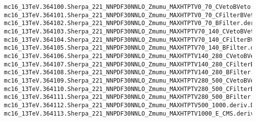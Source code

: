 \begin{tiny}
\begin{verbatim}
mc16_13TeV.364100.Sherpa_221_NNPDF30NNLO_Zmumu_MAXHTPTV0_70_CVetoBVeto.deriv.DAOD_STDM7.e5271_s3126_r10724_p3712
mc16_13TeV.364101.Sherpa_221_NNPDF30NNLO_Zmumu_MAXHTPTV0_70_CFilterBVeto.deriv.DAOD_STDM7.e5271_s3126_r10724_p3712
mc16_13TeV.364102.Sherpa_221_NNPDF30NNLO_Zmumu_MAXHTPTV0_70_BFilter.deriv.DAOD_STDM7.e5271_s3126_r10724_p3712
mc16_13TeV.364103.Sherpa_221_NNPDF30NNLO_Zmumu_MAXHTPTV70_140_CVetoBVeto.deriv.DAOD_STDM7.e5271_s3126_r10724_p3712
mc16_13TeV.364104.Sherpa_221_NNPDF30NNLO_Zmumu_MAXHTPTV70_140_CFilterBVeto.deriv.DAOD_STDM7.e5271_s3126_r10724_p3712
mc16_13TeV.364105.Sherpa_221_NNPDF30NNLO_Zmumu_MAXHTPTV70_140_BFilter.deriv.DAOD_STDM7.e5271_s3126_r10724_p3712
mc16_13TeV.364106.Sherpa_221_NNPDF30NNLO_Zmumu_MAXHTPTV140_280_CVetoBVeto.deriv.DAOD_STDM7.e5271_s3126_r10724_p3712
mc16_13TeV.364107.Sherpa_221_NNPDF30NNLO_Zmumu_MAXHTPTV140_280_CFilterBVeto.deriv.DAOD_STDM7.e5271_s3126_r10724_p3712
mc16_13TeV.364108.Sherpa_221_NNPDF30NNLO_Zmumu_MAXHTPTV140_280_BFilter.deriv.DAOD_STDM7.e5271_s3126_r10724_p3712
mc16_13TeV.364109.Sherpa_221_NNPDF30NNLO_Zmumu_MAXHTPTV280_500_CVetoBVeto.deriv.DAOD_STDM7.e5271_s3126_r10724_p3712
mc16_13TeV.364110.Sherpa_221_NNPDF30NNLO_Zmumu_MAXHTPTV280_500_CFilterBVeto.deriv.DAOD_STDM7.e5271_s3126_r10724_p3712
mc16_13TeV.364111.Sherpa_221_NNPDF30NNLO_Zmumu_MAXHTPTV280_500_BFilter.deriv.DAOD_STDM7.e5271_s3126_r10724_p3712
mc16_13TeV.364112.Sherpa_221_NNPDF30NNLO_Zmumu_MAXHTPTV500_1000.deriv.DAOD_STDM7.e5271_s3126_r10724_p3712
mc16_13TeV.364113.Sherpa_221_NNPDF30NNLO_Zmumu_MAXHTPTV1000_E_CMS.deriv.DAOD_STDM7.e5271_s3126_r10724_p3712
\end{verbatim}
\end{tiny}
